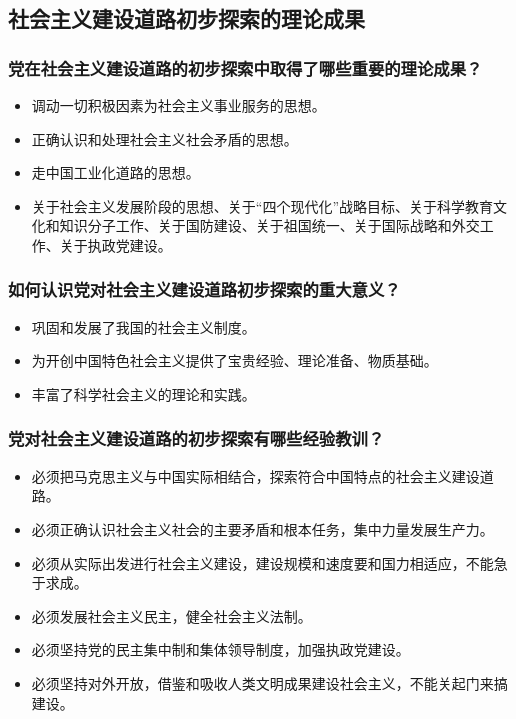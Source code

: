 \documentclass{article}
\begin{document}
\subsection{社会主义建设道路初步探索的理论成果}

\subsubsection{党在社会主义建设道路的初步探索中取得了哪些重要的理论成果？}
\begin{itemize}
    \item 调动一切积极因素为社会主义事业服务的思想。
    \item 正确认识和处理社会主义社会矛盾的思想。
    \item 走中国工业化道路的思想。
    \item 关于社会主义发展阶段的思想、关于“四个现代化”战略目标、关于科学教育文化和知识分子工作、关于国防建设、关于祖国统一、关于国际战略和外交工作、关于执政党建设。
\end{itemize}

\subsubsection{如何认识党对社会主义建设道路初步探索的重大意义？}
\begin{itemize}
    \item 巩固和发展了我国的社会主义制度。
    \item 为开创中国特色社会主义提供了宝贵经验、理论准备、物质基础。
    \item 丰富了科学社会主义的理论和实践。
\end{itemize}

\subsubsection{党对社会主义建设道路的初步探索有哪些经验教训？}
\begin{itemize}
    \item 必须把马克思主义与中国实际相结合，探索符合中国特点的社会主义建设道路。
    \item 必须正确认识社会主义社会的主要矛盾和根本任务，集中力量发展生产力。
    \item 必须从实际出发进行社会主义建设，建设规模和速度要和国力相适应，不能急于求成。
    \item 必须发展社会主义民主，健全社会主义法制。
    \item 必须坚持党的民主集中制和集体领导制度，加强执政党建设。
    \item 必须坚持对外开放，借鉴和吸收人类文明成果建设社会主义，不能关起门来搞建设。
\end{itemize}
\end{document}

